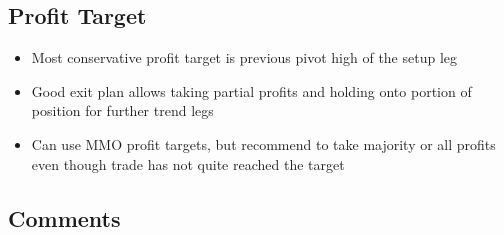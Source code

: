 \documentclass{../notes}
\begin{document}
\subsection{Profit Target}
\begin{itemize}
  \item Most conservative profit target is previous pivot high of the setup leg
  \item Good exit plan allows taking partial profits and holding onto portion of position for further trend legs
  \item Can use MMO profit targets, but recommend to take majority or all profits even though trade has not quite reached the target
\end{itemize}
\subsection{Comments}
\end{document}
